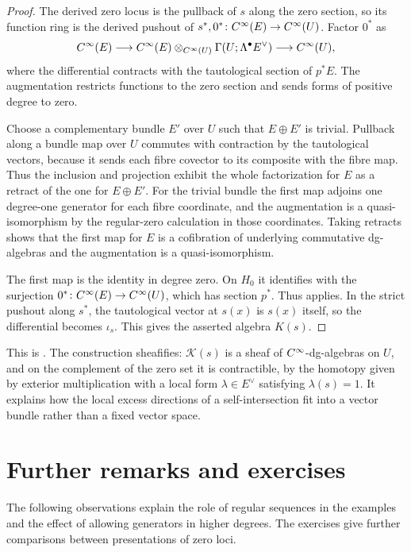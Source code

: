 \begin{proof}
The derived zero locus is the pullback of $s$ along the zero section, so
its function ring is the derived pushout of
$s^*,0^*\colon C^\infty(E)\to C^\infty(U)$. Factor $0^*$ as
\[
 C^\infty(E)\longrightarrow
 C^\infty(E)\otimes_{C^\infty(U)}\Gamma(U;\Lambda^\bullet E^\vee)
 \longrightarrow C^\infty(U),
\]
where the differential contracts with the tautological section of $p^*E$.
The augmentation restricts functions to the zero section and sends forms
of positive degree to zero.

Choose a complementary bundle $E'$ over $U$ such that $E\oplus E'$ is
trivial. Pullback along a bundle map over $U$ commutes with contraction
by the tautological vectors, because it sends each fibre covector to
its composite with the fibre map. Thus the inclusion and projection
exhibit the whole factorization for $E$ as a retract of the one for
$E\oplus E'$. For the trivial bundle the first map adjoins one
degree-one generator for each fibre coordinate, and the augmentation
is a quasi-isomorphism by the regular-zero calculation in those
coordinates. Taking retracts shows that the first map for $E$ is a
cofibration of underlying commutative dg-algebras and the augmentation
is a quasi-isomorphism.

The first map is the identity in degree zero. On $H_0$ it identifies
with the surjection $0^*\colon C^\infty(E)\to C^\infty(U)$, which has
section $p^*$. Thus \citet[Corollary~3.3.15]{Steffens_Derived_Cinfty_Geometry_I}
applies. In the strict pushout along $s^*$, the tautological vector at
$s(x)$ is $s(x)$ itself, so the differential becomes $\iota_s$.
This gives the asserted algebra $K(s)$.
\end{proof}

This is \cite[Example~3.3.17]{Steffens_Derived_Cinfty_Geometry_I}.
The construction sheafifies: $\mathcal K(s)$ is a sheaf of
$C^\infty$-dg-algebras on $U$, and on the complement of the zero set it is
contractible, by the homotopy given by exterior multiplication with a
local form $\lambda\in E^\vee$ satisfying $\lambda(s)=1$.
It explains how the local excess directions of a self-intersection fit
into a vector bundle rather than a fixed vector space.

\section{Further remarks and exercises}

The following observations explain the role of regular sequences in the
examples and the effect of allowing generators in higher degrees.
The exercises give further comparisons between presentations of zero loci.

